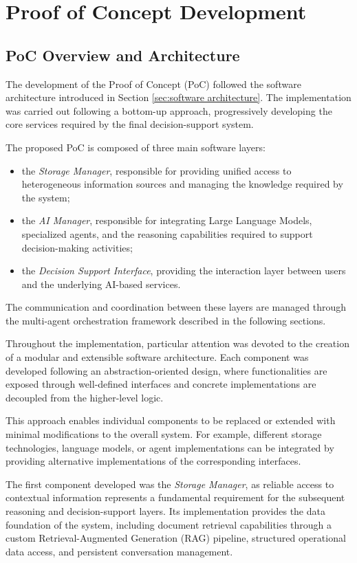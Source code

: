 \chapter{Proof of Concept Development}
\section{PoC Overview and Architecture}

The development of the Proof of Concept (PoC) followed the software architecture introduced in Section \ref{sec:software architecture}. The implementation was carried out following a bottom-up approach, progressively developing the core services required by the final decision-support system.

The proposed PoC is composed of three main software layers:

\begin{itemize}
    \item the \textit{Storage Manager}, responsible for providing unified access to heterogeneous information sources and managing the knowledge required by the system;
    \item the \textit{AI Manager}, responsible for integrating Large Language Models, specialized agents, and the reasoning capabilities required to support decision-making activities;
    \item the \textit{Decision Support Interface}, providing the interaction layer between users and the underlying AI-based services.
\end{itemize}

The communication and coordination between these layers are managed through the multi-agent orchestration framework described in the following sections.

Throughout the implementation, particular attention was devoted to the creation of a modular and extensible software architecture. Each component was developed following an abstraction-oriented design, where functionalities are exposed through well-defined interfaces and concrete implementations are decoupled from the higher-level logic.

This approach enables individual components to be replaced or extended with minimal modifications to the overall system. For example, different storage technologies, language models, or agent implementations can be integrated by providing alternative implementations of the corresponding interfaces.

The first component developed was the \textit{Storage Manager}, as reliable access to contextual information represents a fundamental requirement for the subsequent reasoning and decision-support layers. Its implementation provides the data foundation of the system, including document retrieval capabilities through a custom Retrieval-Augmented Generation (RAG) pipeline, structured operational data access, and persistent conversation management.

